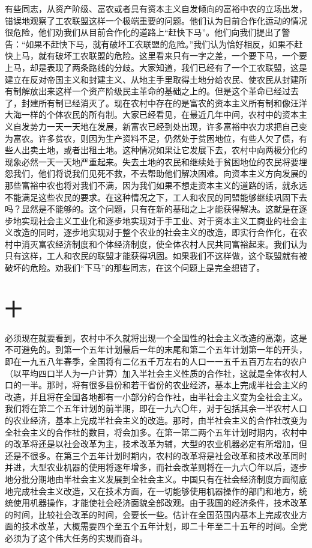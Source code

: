 有些同志，从资产阶级、富农或者具有资本主义自发倾向的富裕中农的立场出发，错误地观察了工农联盟这样一个极端重要的问题。他们认为目前合作化运动的情况很危险，他们劝我们从目前合作化的道路上“赶快下马”。他们向我们提出了警告：“如果不赶快下马，就有破坏工农联盟的危险。”我们认为恰好相反，如果不赶快上马，就有破坏工农联盟的危险。这里看来只有一字之差，一个要下马，一个要上马，却是表现了两条路线的分歧。大家知道，我们已经有了一个工农联盟，这是建立在反对帝国主义和封建主义、从地主手里取得土地分给农民、使农民从封建所有制解放出来这样一个资产阶级民主革命的基础之上的。但是这个革命已经过去了，封建所有制已经消灭了。现在农村中存在的是富农的资本主义所有制和像汪洋大海一样的个体农民的所有制。大家已经看见，在最近几年中间，农村中的资本主义自发势力一天一天地在发展，新富农已经到处出现，许多富裕中农力求把自己变为富农。许多贫农，则因为生产资料不足，仍然处于贫困地位，有些人欠了债，有些人出卖土地，或者出租土地。这种情况如果让它发展下去，农村中向两极分化的现象必然一天一天地严重起来。失去土地的农民和继续处于贫困地位的农民将要埋怨我们，他们将说我们见死不救，不去帮助他们解决困难。向资本主义方向发展的那些富裕中农也将对我们不满，因为我们如果不想走资本主义的道路的话，就永远不能满足这些农民的要求。在这种情况之下，工人和农民的同盟能够继续巩固下去吗？显然是不能够的。这个问题，只有在新的基础之上才能获得解决。这就是在逐步地实现社会主义工业化和逐步地实现对于手工业、对于资本主义工商业的社会主义改造的同时，逐步地实现对于整个农业的社会主义的改造，即实行合作化，在农村中消灭富农经济制度和个体经济制度，使全体农村人民共同富裕起来。我们认为只有这样，工人和农民的联盟才能获得巩固。如果我们不这样做，这个联盟就有被破坏的危险。劝我们“下马”的那些同志，在这个问题上是完全想错了。

\section*{十}

必须现在就要看到，农村中不久就将出现一个全国性的社会主义改造的高潮，这是不可避免的。到第一个五年计划最后一年的末尾和第二个五年计划第一年的开头，即在一九五八年春季，全国将有二亿五千万左右的人口一一五千五百万左右的农户（以平均四口半人为一户计算）加入半社会主义性质的合作社，这就是全体农村人口的一半。那时，将有很多县份和若干省份的农业经济，基本上完成半社会主义的改造，并且将在全国各地都有一小部分的合作社，由半社会主义变为全社会主义。我们将在第二个五年计划的前半期，即在一九六〇年，对于包括其余一半农村人口的农业经济，基本上完成半社会主义的改造。那时，由半社会主义的合作社改变为全社会主义的合作社的数目，将会加多。在第一第二两个五年计划时期内，农村中的改革将还是以社会改革为主，技术改革为辅，大型的农业机器必定有所增加，但还是不很多。在第三个五年计划时期内，农村的改革将是社会改革和技术改革同时并进，大型农业机器的使用将逐年增多，而社会改革则将在一九六〇年以后，逐步地分批分期地由半社会主义发展到全社会主义。中国只有在社会经济制度方面彻底地完成社会主义改造，又在技术方面，在一切能够使用机器操作的部门和地方，统统使用机器操作，才能使社会经济面貌全部改观。由于我国的经济条件，技术改革的时间，比较社会改革的时间，会要长一些。估计在全国范围内基本上完成农业方面的技术改革，大概需要四个至五个五年计划，即二十年至二十五年的时间。全党必须为了这个伟大任务的实现而奋斗。

